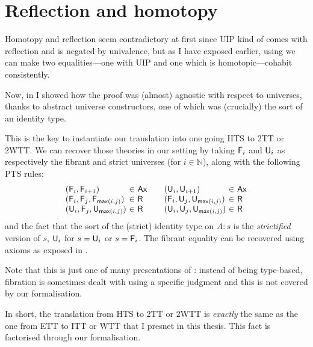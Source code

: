 \chapter{Reflection and homotopy}

Homotopy and reflection seem contradictory at first since \acrshort{UIP}
kind of comes with reflection and is negated by univalence, but as I have
exposed earlier, using  we can make two equalities---one with
\acrshort{UIP} and one which is homotopic---cohabit consistently.

Now, in  I showed how the proof was
(almost) agnostic with respect to universes, thanks to abstract universe
constructors, one of which was (crucially) the sort of an identity type.

This is the key to instantiate our translation into one going \acrshort{HTS}
to \acrshort{2TT} or \acrshort{2WTT}.
We can recover those theories in our setting by taking $\mathsf{F}_{i}$ and $\mathsf{U}_{i}$ as
respectively the fibrant and strict universes
(for $i \in \mathbb{N}$), along with the following \acrshort{PTS} rules:
%
\[
\begin{array}{l@{~}c@{~}l@{\qquad}l@{~}c@{~}l}
  (\F{i}, \F{i+1}) &\in& \Ax &
  (\Un{i}, \Un{i+1}) &\in& \Ax \\
  (\F{i}, \F{j}, \F{\nmax{i}{j}}) &\in& \Rl &
  (\F{i}, \Un{j}, \Un{\nmax{i}{j}}) &\in& \Rl \\
  (\Un{i}, \F{j}, \Un{\nmax{i}{j}}) &\in& \Rl &
  (\Un{i}, \Un{j}, \Un{\nmax{i}{j}}) &\in& \Rl \\
\end{array}
\]
%
and the fact that the sort of the (strict) identity type on $A : s$ is
the \emph{strictified} version of $s$, \ie $\mathsf{U}_{i}$ for $s = \mathsf{U}_{i}$ or
$s = \mathsf{F}_{i}$.
The fibrant equality can be recovered using axioms as exposed in
.

Note that this is just one of many presentations of : instead
of being type-based, fibration is sometimes dealt with using a specific
judgment and this is not covered by our formalisation.

In short, the translation from \acrshort{HTS} to \acrshort{2TT} or
\acrshort{2WTT} is \emph{exactly} the same as the one
from \acrshort{ETT} to \acrshort{ITT} or \acrshort{WTT} that I presnet in this
thesis. This fact is factorised through our formalisation.